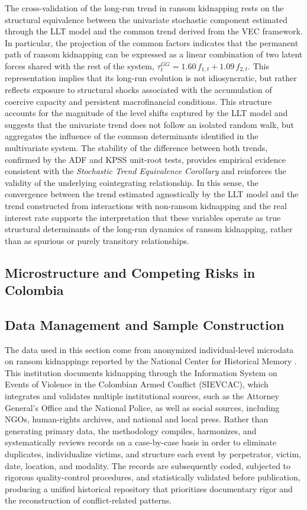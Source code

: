 \documentclass[12pt,a4paper]{article}
\providecommand{\textcite}{\citet}
\theoremstyle{plain}
\theoremstyle{definition}
\theoremstyle{remark}
\newcommand{\1}{\mathbf{1}}
\begin{document}
The cross-validation of the long-run trend in ransom kidnapping rests on the structural equivalence between the univariate stochastic component estimated through the LLT model and the common trend derived from the VEC framework. In particular, the projection of the common factors indicates that the permanent path of ransom kidnapping can be expressed as a linear combination of two latent forces shared with the rest of the system, $\tau^{GG}_t = 1.60\,f_{1,t} + 1.09\,f_{2,t}$. This representation implies that its long-run evolution is not idiosyncratic, but rather reflects exposure to structural shocks associated with the accumulation of coercive capacity and persistent macrofinancial conditions. This structure accounts for the magnitude of the level shifts captured by the LLT model and suggests that the univariate trend does not follow an isolated random walk, but aggregates the influence of the common determinants identified in the multivariate system. The stability of the difference between both trends, confirmed by the ADF and KPSS unit-root tests, provides empirical evidence consistent with the \textit{Stochastic Trend Equivalence Corollary} and reinforces the validity of the underlying cointegrating relationship. In this sense, the convergence between the trend estimated agnostically by the LLT model and the trend constructed from interactions with non-ransom kidnapping and the real interest rate supports the interpretation that these variables operate as true structural determinants of the long-run dynamics of ransom kidnapping, rather than as spurious or purely transitory relationships.


\subsection{Microstructure and Competing Risks in Colombia}
\label{sec:empirico}

\subsection{Data Management and Sample Construction}

The data used in this section come from anonymized individual-level microdata on ransom kidnappings reported by the National Center for Historical Memory \textcite{cnmh_datos}. This institution documents kidnapping through the Information System on Events of Violence in the Colombian Armed Conflict (SIEVCAC), which integrates and validates multiple institutional sources, such as the Attorney General's Office and the National Police, as well as social sources, including NGOs, human-rights archives, and national and local press. Rather than generating primary data, the methodology compiles, harmonizes, and systematically reviews records on a case-by-case basis in order to eliminate duplicates, individualize victims, and structure each event by perpetrator, victim, date, location, and modality. The records are subsequently coded, subjected to rigorous quality-control procedures, and statistically validated before publication, producing a unified historical repository that prioritizes documentary rigor and the reconstruction of conflict-related patterns.
\end{document}
